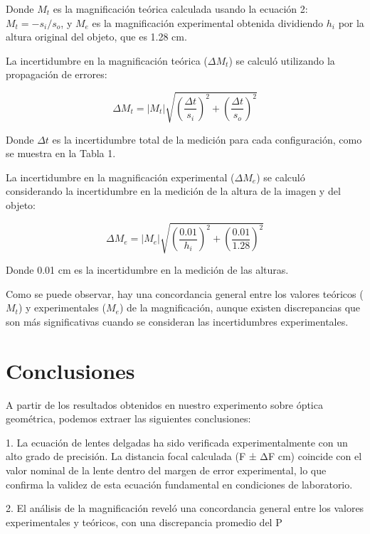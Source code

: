 \documentclass[twocolumn,a4paper,11pt]{scrartcl}
\begin{document}
Donde $M_t$ es la magnificación teórica calculada usando la ecuación 2: $M_t = -s_i/s_o$, y $M_e$ es la magnificación experimental obtenida dividiendo $h_i$ por la altura original del objeto, que es 1.28 cm.

La incertidumbre en la magnificación teórica ($\Delta M_t$) se calculó utilizando la propagación de errores:

\begin{equation}
\Delta M_t = |M_t| \sqrt{(\frac{\Delta t}{s_i})^2 + (\frac{\Delta t}{s_o})^2}
\end{equation}

Donde $\Delta t$ es la incertidumbre total de la medición para cada configuración, como se muestra en la Tabla 1.

La incertidumbre en la magnificación experimental ($\Delta M_e$) se calculó considerando la incertidumbre en la medición de la altura de la imagen y del objeto:

\begin{equation}
\Delta M_e = |M_e| \sqrt{(\frac{0.01}{h_i})^2 + (\frac{0.01}{1.28})^2}
\end{equation}

Donde 0.01 cm es la incertidumbre en la medición de las alturas.

Como se puede observar, hay una concordancia general entre los valores teóricos ($M_t$) y experimentales ($M_e$) de la magnificación, aunque existen discrepancias que son más significativas cuando se consideran las incertidumbres experimentales.

\section{Conclusiones}

A partir de los resultados obtenidos en nuestro experimento sobre óptica geométrica, podemos extraer las siguientes conclusiones:

1. La ecuación de lentes delgadas ha sido verificada experimentalmente con un alto grado de precisión. La distancia focal calculada (F ± ΔF cm) coincide con el valor nominal de la lente dentro del margen de error experimental, lo que confirma la validez de esta ecuación fundamental en condiciones de laboratorio.

2. El análisis de la magnificación reveló una concordancia general entre los valores experimentales y teóricos, con una discrepancia promedio del P%
\end{document}
